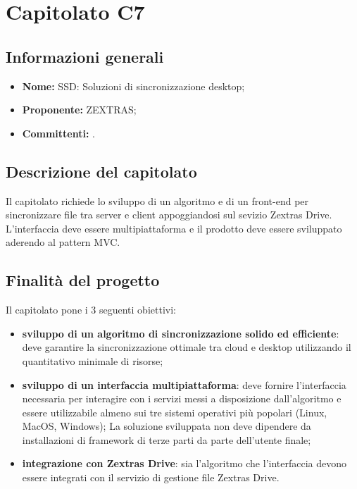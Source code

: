 \section{Capitolato C7}

\subsection{Informazioni generali}
\begin{itemize}
\item \textbf{Nome:} SSD: Soluzioni di sincronizzazione desktop;
\item \textbf{Proponente:} ZEXTRAS;
\item \textbf{Committenti:} \committenti{}.
\end{itemize}

\subsection{Descrizione del capitolato}
Il capitolato richiede lo sviluppo di un algoritmo e di un front-end per sincronizzare file tra server e client appoggiandosi sul sevizio Zextras Drive.
L'interfaccia deve essere multipiattaforma e il prodotto deve essere sviluppato aderendo al pattern MVC.

\subsection{Finalità del progetto}
Il capitolato pone i 3 seguenti obiettivi:
\begin{itemize}
\item \textbf{sviluppo di un algoritmo di sincronizzazione solido ed efficiente}: deve garantire la sincronizzazione ottimale tra cloud e desktop utilizzando il quantitativo minimale di risorse;
\item \textbf{sviluppo di un interfaccia multipiattaforma}: deve fornire l'interfaccia necessaria per interagire con i servizi messi a disposizione 
dall'algoritmo e essere utilizzabile almeno sui tre sistemi operativi più popolari (Linux, MacOS, Windows);
La soluzione sviluppata non deve dipendere da installazioni di framework di terze parti da parte dell'utente finale;
\item \textbf{integrazione con Zextras Drive}: sia l'algoritmo che l'interfaccia devono essere integrati con il servizio di gestione file Zextras Drive.
\end{itemize}

